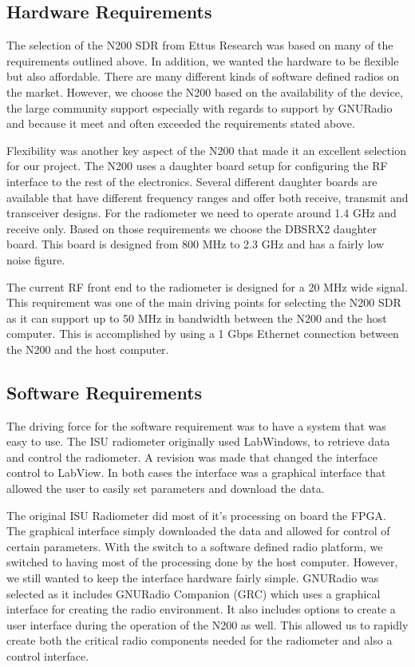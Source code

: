 \subsection{Hardware Requirements}

The selection of the N200 SDR from Ettus Research was based on many of the requirements outlined above.  In addition, we wanted the hardware to be flexible but also affordable.  There are many different kinds of software defined radios on the market.  However, we choose the N200 based on the availability of the device, the large community support especially with regards to support by GNURadio and because it meet and often exceeded the requirements stated above.  

Flexibility was another key aspect of the N200 that made it an excellent selection for our project.  The N200 uses a daughter board setup for configuring the RF interface to the rest of the electronics.  Several different daughter boards are available that have different frequency ranges and offer both receive, transmit and transceiver designs.  For the radiometer we need to operate around 1.4 GHz and receive only.  Based on those requirements we choose the DBSRX2 daughter board.  This board is designed from 800 MHz to 2.3 GHz and has a fairly low noise figure.   


The current RF front end to the radiometer is designed for a 20 MHz wide signal.  This requirement was one of the main driving points for selecting the N200 SDR as it can support up to 50 MHz in bandwidth between the N200 and the host computer.  This is accomplished by using a 1 Gbps Ethernet connection between the N200 and the host computer.


\subsection{Software Requirements}

The driving force for the software requirement was to have a system that was easy to use.  The ISU radiometer originally used LabWindows, to retrieve data and control the radiometer.  A revision was made that changed the interface control to LabView.  In both cases the interface was a graphical interface that allowed the user to easily set parameters and download the data.

The original ISU Radiometer did most of it's processing on board the FPGA.  The graphical interface simply downloaded the data and allowed for control of certain parameters.  With the switch to a software defined radio platform, we switched to having most of the processing done by the host computer.  However, we still wanted to keep the interface hardware fairly simple.  GNURadio was selected as it includes GNURadio Companion (GRC) which uses a graphical interface for creating the radio environment.  It also includes options to create a user interface during the operation of the N200 as well.  This allowed us to rapidly create both the critical radio components needed for the radiometer and also a control interface.


